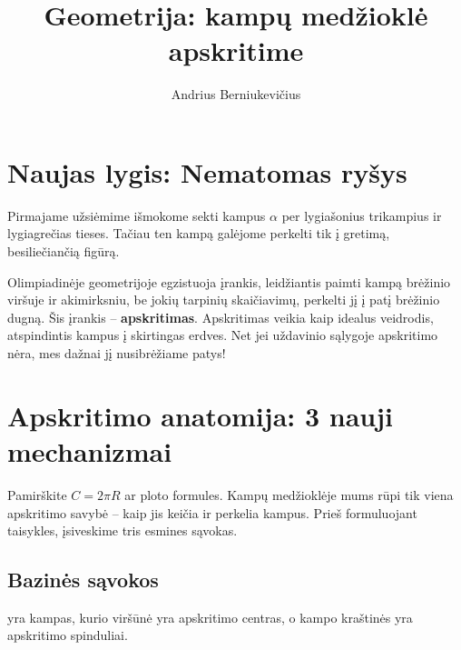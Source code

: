 \documentclass[11pt,a4paper]{scrartcl}
\title{Geometrija: kampų medžioklė apskritime}
\author{Andrius Berniukevičius}
\begin{document}
\maketitle

\section{Naujas lygis: Nematomas ryšys}

Pirmajame užsiėmime išmokome sekti kampus $\alpha$ per lygiašonius trikampius ir lygiagrečias tieses. Tačiau ten kampą galėjome perkelti tik į gretimą, besiliečiančią figūrą. 

Olimpiadinėje geometrijoje egzistuoja įrankis, leidžiantis paimti kampą brėžinio viršuje ir akimirksniu, be jokių tarpinių skaičiavimų, perkelti jį į patį brėžinio dugną. Šis įrankis – \textbf{apskritimas}. Apskritimas veikia kaip idealus veidrodis, atspindintis kampus į skirtingas erdves. Net jei uždavinio sąlygoje apskritimo nėra, mes dažnai jį nusibrėžiame patys!

\section{Apskritimo anatomija: 3 nauji mechanizmai}

Pamirškite $C = 2\pi R$ ar ploto formules. Kampų medžioklėje mums rūpi tik viena apskritimo savybė – kaip jis keičia ir perkelia kampus. Prieš formuluojant taisykles, įsiveskime tris esmines sąvokas.

\subsection*{Bazinės sąvokos}

\begin{definition}
 yra kampas, kurio viršūnė yra apskritimo centras, o kampo kraštinės yra apskritimo spinduliai.
\end{definition}

\begin{center}
\end{center}
\end{document}
